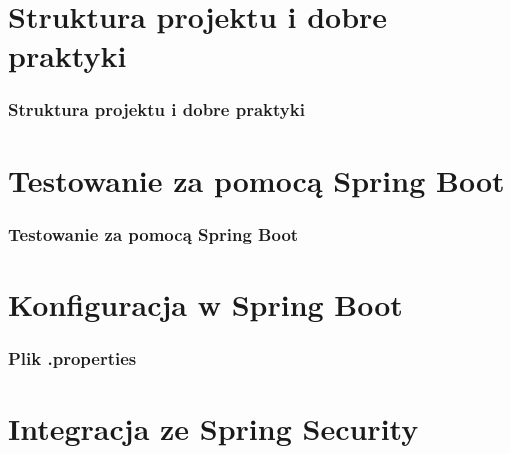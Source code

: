 \documentclass{beamer}
\begin{document}
\section{Struktura projektu i dobre praktyki}

\begin{frame}
\frametitle{Struktura projektu i dobre praktyki}
\end{frame}

\section{Testowanie za pomocą Spring Boot}

\begin{frame}
\frametitle{Testowanie za pomocą Spring Boot}
\end{frame}

\section{Konfiguracja w Spring Boot}

\begin{frame}
\frametitle{Plik .properties}
\end{frame}

\section{Integracja ze Spring Security}

\begin{frame}
\frametitle{}
\end{frame}
\end{document}
